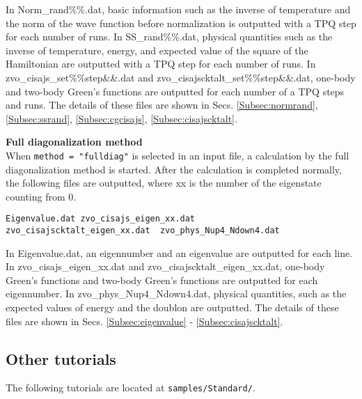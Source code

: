 \begin{description}
In Norm\_rand\%\%.dat, basic information such as the inverse of temperature
and the norm of the wave function before normalization
is outputted with a TPQ step for each number of runs.
In SS\_rand\%\%.dat, physical quantities such as the inverse of temperature,
energy, and expected value of the square of the Hamiltonian
are outputted with a TPQ step for each number of runs.
In zvo\_cisajs\_set\%\%step\&\&.dat and zvo\_cisajscktalt\_set\%\%step\&\&.dat,
one-body and two-body Green's functions are outputted
for each number of a TPQ steps and runs.
The details of these files are shown in Secs. \ref{Subsec:normrand}, \ref{Subsec:ssrand},
\ref{Subsec:cgcisajs}, \ref{Subsec:cisajscktalt}.

\item {\bf Full diagonalization method}\\
  When \verb|method = "fulldiag"| is selected in an input file,
  a calculation by the full diagonalization method is started.
  After the calculation is completed normally, the following files are outputted,
  where xx is the number of the eigenstate counting from 0. \\
\begin{minipage}{14cm}
\begin{screen}
\begin{verbatim}
Eigenvalue.dat zvo_cisajs_eigen_xx.dat
zvo_cisajscktalt_eigen_xx.dat  zvo_phys_Nup4_Ndown4.dat
\end{verbatim}
\end{screen}
\end{minipage}

In Eigenvalue.dat, an eigennumber and an eigenvalue are outputted for each line.
In zvo\_cisajs\_eigen\_xx.dat and zvo\_cisajscktalt\_eigen\_xx.dat,
one-body Green's functions and two-body Green's functions are outputted
for each eigennumber. 
In zvo\_phys\_Nup4\_Ndown4.dat, physical quantities,
such as the expected values of energy and the doublon are outputted.
The details of these files are shown in
Secs. \ref{Subsec:eigenvalue} - \ref{Subsec:cisajscktalt}.


\end{description}

\subsection{Other tutorials}

The following tutorials are located at
\verb|samples/Standard/|.

